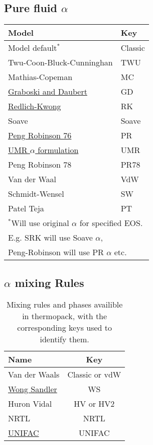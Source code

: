 \documentclass[english]{../thermomemo/thermomemo}
\newcommand{\mathsec}[1]{\texorpdfstring{#1}{TEXT}} %
\begin{document}
\subsection{Pure fluid \mathsec{$\alpha$}}
\begin{table}[ht!]
  \centering
  \begin{tabular}{l l}
    \toprule
    Model & Key \\
    \midrule
    Model default$^*$ & Classic\\
    Twu-Coon-Bluck-Cunninghan & TWU\\
    Mathias-Copeman & MC\\
    \href{https://pubs.acs.org/doi/abs/10.1021/i260068a009}{Graboski and Daubert} & GD\\
    \href{https://doi.org/10.1021/cr60137a013}{Redlich-Kwong} & RK\\
    Soave & Soave\\
    \href{https://doi.org/10.1021/i160057a011}{Peng Robinson 76} & PR\\
    \href{https://doi.org/10.1021/ie049580p}{UMR $\alpha$ formulation} & UMR\\
    Peng Robinson 78 & PR78\\
    Van der Waal & VdW\\
    Schmidt-Wensel & SW\\
    Patel Teja & PT\\
    \bottomrule
    \multicolumn{2}{l}{$^*$Will use original $\alpha$ for specified EOS.}\\
    \multicolumn{2}{l}{ E.g. SRK will use Soave $\alpha$,}\\
    \multicolumn{2}{l}{ Peng-Robinson will use PR $\alpha$ etc.}\\
  \end{tabular}
\end{table}

\subsection{\mathsec{$\alpha$} mixing Rules}
\begin{table}[ht!]
  \centering
  \begin{tabular}{l c}
    \toprule
    Name & Key \\
    \midrule
    Van der Waals & Classic or vdW\\
    \href{https://github.com/SINTEF/thermopack/tree/main/doc/memo/WongSandler/wongsandler.pdf}{Wong Sandler} & WS \\
    Huron Vidal & HV or HV2 \\
    NRTL & NRTL \\
    \href{https://github.com/SINTEF/thermopack/tree/main/doc/memo/UNIFAC/unifac.pdf}{UNIFAC} & UNIFAC \\
    \bottomrule
  \end{tabular}
  \caption{Mixing rules and phases availible in thermopack, with the corresponding keys used to identify them.}
  \label{tab:mixing_rules_thermopack}
\end{table}
\end{document}
